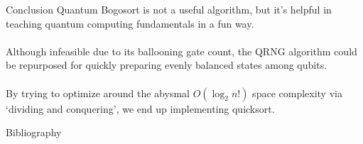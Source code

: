 \documentclass{beamer}
\begin{document}
  \begin{frame}{Conclusion}
  Quantum Bogosort is not a useful algorithm, but it's helpful in teaching quantum computing fundamentals in a fun way. \\ \\
  Although infeasible due to its ballooning gate count, the QRNG algorithm could be repurposed for quickly preparing evenly balanced states among qubits. \\ \\
  By trying to optimize around the abysmal $ O(\log_2 n!) $ space complexity via `dividing and conquering', we end up implementing quicksort.
  \end{frame}
  
  \begin{frame}{Bibliography}
  
  
  \end{frame}
  
  
\end{document}
